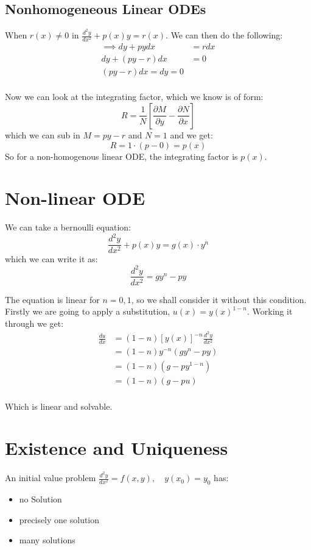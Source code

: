 \documentclass{article}
\newcommand{\dii}{\frac{d^2y}{dx^2}}
\newcommand{\pd}[2]{\frac{\partial#1}{\partial#2}}
\newcommand{\fd}[2]{\frac{d #1}{d #2}}
\begin{document}
\subsection{Nonhomogeneous Linear ODEs}

When $\displaystyle{r(x) \neq 0}$ in $\displaystyle{\dii + p(x)y = r(x)}$. We can then do the following:
\begin{align*}
  \implies dy + pydx &= rdx \\
  dy + (py - r)dx &= 0 \\
  (py - r)dx = dy = 0 \\
\end{align*}

Now we can look at the integrating factor, which we know is of form:
$$ R = \frac{1}{N}\left[\pd{M}{y} - \pd{N}{x}\right] $$
which we can sub in $\displaystyle{M = py - r}$ and $\displaystyle{N = 1}$ and we get:
$$ R = 1 \cdot (p - 0) = p(x) $$
So for a non-homogenous linear ODE, the integrating factor is $p(x)$.

\section{Non-linear ODE}
We can take a bernoulli equation:
$$ \dii + p(x)y = g(x)\cdot y^n $$
which we can write it as:
$$ \dii = gy^n - py $$

The equation is linear for $n = 0,1$, so we shall consider it without this condition. Firstly we are going to apply a substitution, $u(x) = y(x)^{1-n}$. Working it through we get:
\begin{align*}
  \fd{u}{x} &= (1-n)\left[ y(x) \right]^{-n}\dii \\
  &= (1-n)y^{-n}(gy^n - py) \\
  &= (1 - n)(g - py^{1-n}) \\
  &= (1 - n)(g - pu) \\
\end{align*}

Which is linear and solvable.

\section{Existence and Uniqueness}
An initial value problem $\displaystyle{\dii = f(x, y), \quad y(x_0) = y_0}$ has:
\begin{itemize}
  \item no Solution
  \item precisely one solution
  \item many solutions
\end{itemize}
\end{document}
